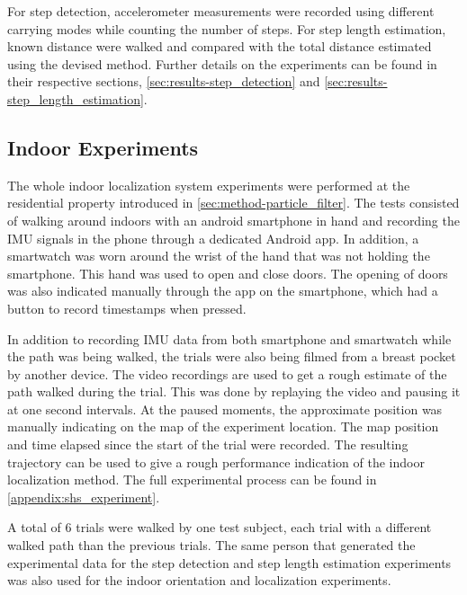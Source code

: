 For step detection, accelerometer measurements were recorded using different carrying modes while counting the number of steps. For step length estimation, known distance were walked and compared with the total distance estimated using the devised method. Further details on the experiments can be found in their respective sections, \cref{sec:results-step_detection} and \cref{sec:results-step_length_estimation}.    \par

\subsection{Indoor Experiments}
\label{sec:results-experi_setup-indoor_experi}
The whole indoor localization system experiments were performed at the residential property introduced in \cref{sec:method-particle_filter}. The tests consisted of walking around indoors with an android smartphone in hand and recording the \ac{IMU} signals in the phone through a dedicated Android app. In addition, a smartwatch was worn around the wrist of the hand that was not holding the smartphone. This hand was used to open and close doors. The opening of doors was also indicated manually through the app on the smartphone, which had a button to record timestamps when pressed.\par 

In addition to recording \ac{IMU} data from both smartphone and smartwatch while the path was being walked, the trials were also being filmed from a breast pocket by another device. The video recordings are used to get a rough estimate of the path walked during the trial. This was done by replaying the video and pausing it at one second intervals. At the paused moments, the approximate position was manually indicating on the map of the experiment location. The map position and time elapsed since the start of the trial were recorded. The resulting trajectory can be used to give a rough performance indication of the indoor localization method. The full experimental process can be found in \cref{appendix:shs_experiment}. \par

A total of 6 trials were walked by one test subject, each trial with a different walked path than the previous trials. The same person that generated the experimental data for the step detection and step length estimation experiments was also used for the indoor orientation and localization experiments.\par 

